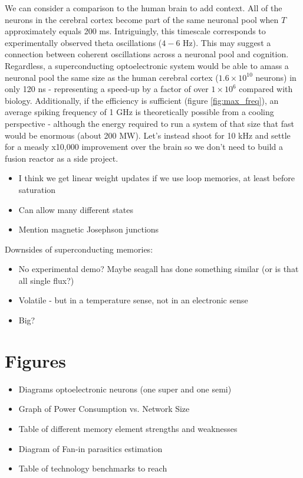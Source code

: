 \documentclass[twocolumn]{article}
\begin{document}
We can consider a comparison to the human brain to add context. All of the neurons in the cerebral cortex become part of the same neuronal pool when $T$ approximately equals 200 ms. Intriguingly, this timescale corresponds to experimentally observed theta oscillations ($4-6$ Hz). This may suggest a connection between coherent oscillations across a neuronal pool and cognition. Regardless, a superconducting optoelectronic system would be able to amass a neuronal pool the same size as the human cerebral cortex ($1.6 \times 10^{10}$ neurons) in only 120 ns - representing a speed-up by a factor of over $1 \times 10^6$ compared with biology. Additionally, if the efficiency is sufficient (figure \ref{fig:max_freq}), an average spiking frequency of 1 GHz is theoretically possible from a cooling perspective - although the energy required to run a system of that size that fast would be enormous (about 200 MW). Let's instead shoot for 10 kHz and settle for a measly x10,000 improvement over the brain so we don't need to build a fusion reactor as a side project. 


\begin{itemize}
\item I think we get linear weight updates if we use loop memories, at least before saturation
\item Can allow many different states
\item Mention magnetic Josephson junctions
\end{itemize}

Downsides of superconducting memories:

\begin{itemize}
    \item No experimental demo? Maybe seagall has done something similar (or is that all single flux?)
    \item Volatile - but in a temperature sense, not in an electronic sense
    \item Big?
\end{itemize}


\section{Figures}
\begin{itemize}
  \item Diagrams optoelectronic neurons (one super and one semi)
  \item Graph of Power Consumption vs. Network Size
  \item Table of different memory element strengths and weaknesses
  \item Diagram of Fan-in parasitics estimation
  \item Table of technology benchmarks to reach
\end{itemize}
\end{document}
